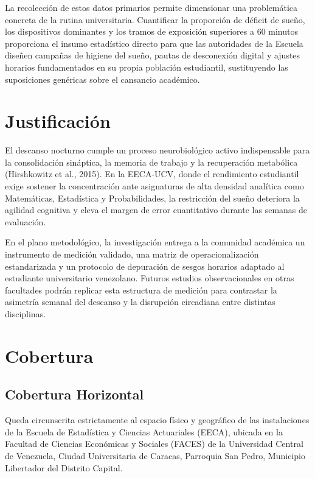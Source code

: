 \documentclass[12pt, letterpaper]{article}
\begin{document}
La recolección de estos datos primarios permite dimensionar una problemática concreta de la rutina universitaria. Cuantificar la proporción de déficit de sueño, los dispositivos dominantes y los tramos de exposición superiores a 60 minutos proporciona el insumo estadístico directo para que las autoridades de la Escuela diseñen campañas de higiene del sueño, pautas de desconexión digital y ajustes horarios fundamentados en su propia población estudiantil, sustituyendo las suposiciones genéricas sobre el cansancio académico.


\section{Justificación}

El descanso nocturno cumple un proceso neurobiológico activo indispensable para la consolidación sináptica, la memoria de trabajo y la recuperación metabólica (Hirshkowitz et al., 2015). En la EECA-UCV, donde el rendimiento estudiantil exige sostener la concentración ante asignaturas de alta densidad analítica como Matemáticas, Estadística y Probabilidades, la restricción del sueño deteriora la agilidad cognitiva y eleva el margen de error cuantitativo durante las semanas de evaluación.

En el plano metodológico, la investigación entrega a la comunidad académica un instrumento de medición validado, una matriz de operacionalización estandarizada y un protocolo de depuración de sesgos horarios adaptado al estudiante universitario venezolano. Futuros estudios observacionales en otras facultades podrán replicar esta estructura de medición para contrastar la asimetría semanal del descanso y la disrupción circadiana entre distintas disciplinas.


\section{Cobertura}

\subsection{Cobertura Horizontal}
Queda circunscrita estrictamente al espacio físico y geográfico de las instalaciones de la Escuela de Estadística y Ciencias Actuariales (EECA), ubicada en la Facultad de Ciencias Económicas y Sociales (FACES) de la Universidad Central de Venezuela, Ciudad Universitaria de Caracas, Parroquia San Pedro, Municipio Libertador del Distrito Capital.
\end{document}
